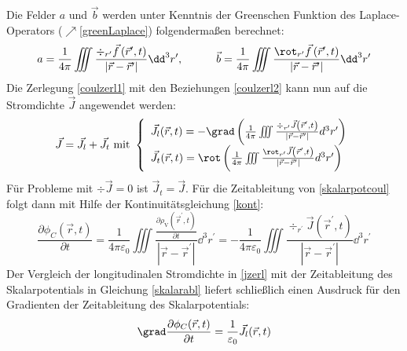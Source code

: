Die Felder $a$ und $\vec{b}$ werden unter Kenntnis der Greenschen Funktion des Laplace-Operators ($\nearrow$\ref{greenLaplace}) folgendermaßen berechnet:
\begin{equation}\label{coulzerl2}
	{a}=\frac{1}{4 \pi} \iiint \frac{\div_{{r}^{\prime}} \vec{{f}}\left(\vec{r}^{\prime}, {t}\right)}{\left|\vec{{r}}-\vec{{r}}^{\prime}\right|} \dd^3 {r}^{\prime}, \quad\quad\quad \vec{{b}}=\frac{1}{4 \pi} \iiint \frac{\rot_{{r}^{\prime}} \vec{{f}}\left(\vec{r}^{\prime}, {t}\right)}{\left|\vec{{r}}-\vec{{r}}^{\prime}\right|} \dd^3 {r}^{\prime} 
\end{equation}
Die Zerlegung \ref{coulzerl1} mit den Beziehungen \ref{coulzerl2} kann nun auf die Stromdichte $\vec{J}$ angewendet werden:
\begin{equation}\label{jzerl}
\vec{J}=\vec{J}_{l}+\vec{J}_{t} \text { mit }\left\{\begin{array}{l}
	\vec{J}_{l}(\vec{r}, t)=-\grad\left(\frac{1}{4 \pi} \iiint \frac{\div_{r^{\prime}} \vec{J}\left(\vec{r}^{\prime}, t\right)}{\left|\vec{r}-\vec{r}^{\prime}\right|} d^{3} r^{\prime}\right)  \\
	\vec{J}_{t}(\vec{r}, t)=\rot\left(\frac{1}{4 \pi} \iiint \frac{\rot_{r^{\prime}} \vec{J}\left(\vec{r}^{\prime}, t\right)}{\left|\vec{r}-\vec{r}^{\prime}\right|} d^{3} r^{\prime}\right)
\end{array}\right.
\end{equation}
Für Probleme mit $\div \vec{J}=0$ ist $\vec{J}_{t}=\vec{J}$. Für die Zeitableitung von \ref{skalarpotcoul} folgt dann mit Hilfe der Kontinuitätsgleichung \ref{kont}:
\begin{equation}\label{skalarabl}
	\frac{\partial \phi_{{C}}(\vec{{r}}, {t})}{\partial {t}}=\frac{1}{4 \pi \varepsilon_{0}} \iiint \frac{\frac{\partial \rho_\text{V}\left(\vec{{r}}^{\prime}, {t}\right)}{\partial {t}}}{\left|\vec{{r}}-\vec{{r}}^{\prime}\right|} \dd^3 {r}^{\prime}=-\frac{1}{4 \pi \varepsilon_{0}} \iiint \frac{\div_{{r}^{\prime}} \vec{{J}}\left(\vec{{r}}^{\prime}, {t}\right)}{\left|\vec{{r}}-\vec{{r}}^{\prime}\right|} \dd^3 {r}^{\prime} 
\end{equation}
Der Vergleich der longitudinalen Stromdichte in \ref{jzerl} mit der Zeitableitung des Skalarpotentials in Gleichung \ref{skalarabl} liefert schließlich einen Ausdruck für den Gradienten der Zeitableitung des Skalarpotentials:
\begin{equation}
	\grad \frac{\partial \phi_{{C}}(\vec{{r}}, {t})}{\partial {t}}=\frac{1}{\varepsilon_{0}} \vec{{J}}_{l}(\vec{{r}}, {t}) 
\end{equation}
